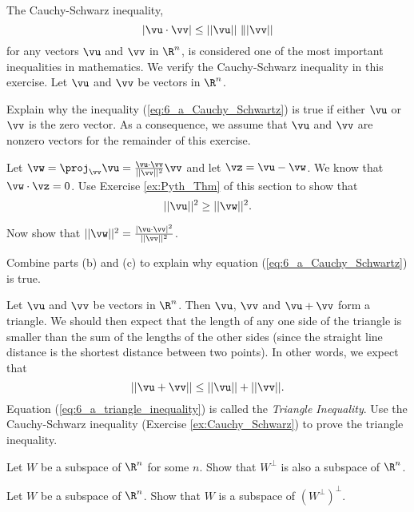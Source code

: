 \item \label{ex:Cauchy_Schwarz} The Cauchy-Schwarz inequality,
\begin{equation} \label{eq:6_a_Cauchy_Schwartz}
|\vu \cdot \vv| \leq ||\vu|| \ \||\vv||
\end{equation}
for any vectors $\vu$ and $\vv$ in $\R^n$, is considered one of the most important inequalities in mathematics. We verify the Cauchy-Schwarz inequality in this exercise. Let $\vu$ and $\vv$ be vectors in $\R^n$.
	\ba
	\item Explain why the inequality (\ref{eq:6_a_Cauchy_Schwartz}) is true if either $\vu$ or $\vv$ is the zero vector. As a consequence, we assume that $\vu$ and $\vv$ are nonzero vectors for the remainder of this exercise. 
	\item Let $\vw = \proj_{\vv} \vu = \frac{\vu \cdot \vv}{||\vv||^2} \vv$ and let $\vz = \vu - \vw$. We know that $\vw \cdot \vz = 0$. Use Exercise \ref{ex:Pyth_Thm} of this section to show that 
	\[||\vu||^2 \geq ||\vw||^2.\]


	\item Now show that $||\vw||^2 = \frac{|\vu \cdot \vv|^2}{||\vv||^2}$. 

	\item Combine parts (b) and (c) to explain why equation (\ref{eq:6_a_Cauchy_Schwartz}) is true. 
	

	\ea
	
\item Let $\vu$ and $\vv$ be vectors in $\R^n$. Then $\vu$, $\vv$ and $\vu+\vv$ form a triangle. We should then expect that the length of any one side of the triangle is smaller than the sum of the lengths of the other sides (since the straight line distance is the shortest distance between two points). In other words, we expect that 
\begin{equation} \label{eq:6_a_triangle_inequality}
||\vu + \vv|| \leq ||\vu|| + ||\vv||.
\end{equation}
Equation (\ref{eq:6_a_triangle_inequality}) is called the \emph{Triangle Inequality}. Use the Cauchy-Schwarz inequality (Exercise \ref{ex:Cauchy_Schwarz}) to prove the triangle inequality.

\item Let $W$ be a subspace of $\R^n$ for some $n$. Show that $W^{\perp}$ is also a subspace of $\R^n$. 

\item Let $W$ be a subspace of $\R^n$. Show that $W$ is a subspace of $(W^\perp)^\perp$.

